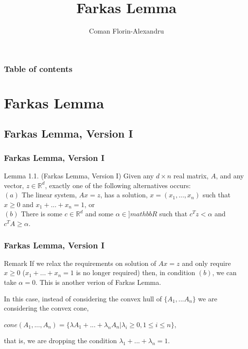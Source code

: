 \documentclass{beamer}
\begin{document}
\title{Farkas Lemma}  
\author{Coman Florin-Alexandru}

\begin{frame}
\titlepage
\end{frame}

\begin{frame}\frametitle{Table of contents}\tableofcontents
\end{frame}

\section{Farkas Lemma}
\subsection{Farkas Lemma, Version I}
\begin{frame}\frametitle{Farkas Lemma, Version I}
\begin{block}{Lemma 1.1. (Farkas Lemma, Version I)}
Given any $d \times n$ real matrix, $A$, and any vector, $z \in \mathbb{R}^d$, exactly one of the following alternatives occurs: \\
$(a)$ The linear system, $A x = z$, has a solution, $x = (x_1, ... , x_n)$ such that $x \geq 0$ and $x_1 + ... + x_n = 1$, or \\
$(b)$ There is some $c \in \mathbb{R}^d$ and some $\alpha \in ]mathbb{R}$ such that $c^T z < \alpha$ and $c^T A \geq \alpha.$ 
\end{block}
\end{frame}

\begin{frame}\frametitle{Farkas Lemma, Version I}
\begin{block}{Remark}
If we relax the requirements on solution of $A x = z$ and only require $x \geq 0$ ($x_1 + ... + x_n = 1$ is no longer required) then, in condition $(b)$, we can take $\alpha = 0$. This is another verion of Farkas Lemma.
\end{block}
\begin{block}{}
In this case, instead of considering the convex hull of $\lbrace A_1, ... A_n \rbrace$ we are considering the convex cone, \\
\centerline{$cone(A_1, ... , A_n) = \lbrace \lambda A_1 + ... + \lambda_n A_n | \lambda_i \geq 0, 1 \leq i \leq n \rbrace$,}
that is, we are dropping the condition $\lambda_1 + ... + \lambda_n = 1$. 
\end{block}
\end{frame}
\end{document}
